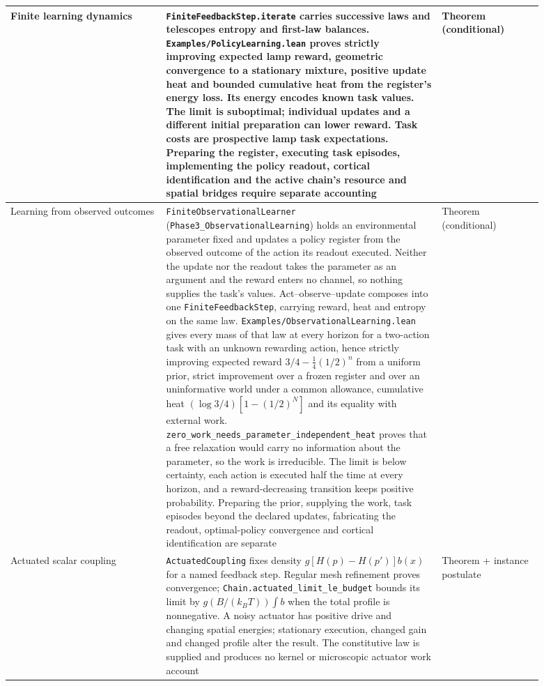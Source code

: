 \documentclass{article}
\begin{document}
\begin{longtable}{|>{\raggedright\arraybackslash}p{0.26\linewidth}|>{\raggedright\arraybackslash}p{0.46\linewidth}|>{\raggedright\arraybackslash}p{0.17\linewidth}|}
Finite learning dynamics & \texttt{FiniteFeedbackStep.iterate} carries successive laws and telescopes entropy and first-law balances. \nolinkurl{Examples/PolicyLearning.lean} proves strictly improving expected lamp reward, geometric convergence to a stationary mixture, positive update heat and bounded cumulative heat from the register's energy loss. Its energy encodes known task values. The limit is suboptimal; individual updates and a different initial preparation can lower reward. Task costs are prospective lamp task expectations. Preparing the register, executing task episodes, implementing the policy readout, cortical identification and the active chain's resource and spatial bridges require separate accounting & Theorem (conditional) \\ \hline
Learning from observed outcomes & \texttt{FiniteObservationalLearner} (\nolinkurl{Phase3_ObservationalLearning}) holds an environmental parameter fixed and updates a policy register from the observed outcome of the action its readout executed. Neither the update nor the readout takes the parameter as an argument and the reward enters no channel, so nothing supplies the task's values. Act--observe--update composes into one \texttt{FiniteFeedbackStep}, carrying reward, heat and entropy on the same law. \texttt{Examples/ObservationalLearning.lean} gives every mass of that law at every horizon for a two-action task with an unknown rewarding action, hence strictly improving expected reward $3/4-\frac14(1/2)^n$ from a uniform prior, strict improvement over a frozen register and over an uninformative world under a common allowance, cumulative heat $(\log3/4)[1-(1/2)^N]$ and its equality with external work. \nolinkurl{zero_work_needs_parameter_independent_heat} proves that a free relaxation would carry no information about the parameter, so the work is irreducible. The limit is below certainty, each action is executed half the time at every horizon, and a reward-decreasing transition keeps positive probability. Preparing the prior, supplying the work, task episodes beyond the declared updates, fabricating the readout, optimal-policy convergence and cortical identification are separate & Theorem (conditional) \\ \hline
Actuated scalar coupling & \texttt{ActuatedCoupling} fixes density $g[H(p)-H(p')]b(x)$ for a named feedback step. Regular mesh refinement proves convergence; \nolinkurl{Chain.actuated_limit_le_budget} bounds its limit by $g(B/(k_BT))\int b$ when the total profile is nonnegative. A noisy actuator has positive drive and changing spatial energies; stationary execution, changed gain and changed profile alter the result. The constitutive law is supplied and produces no kernel or microscopic actuator work account & Theorem + instance postulate \\ \hline

\end{longtable}
\end{document}
